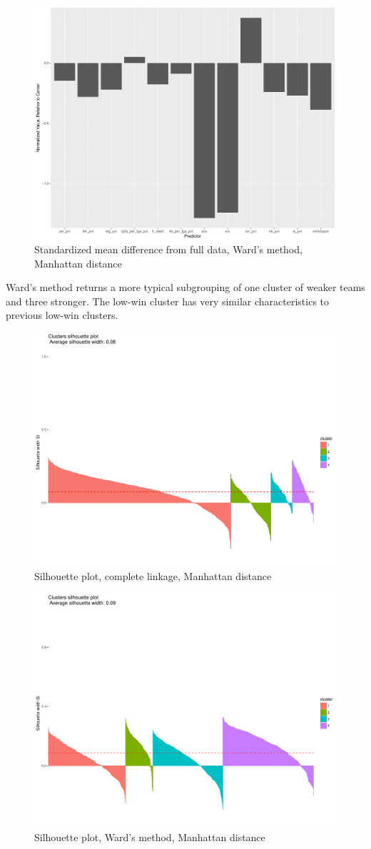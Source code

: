 \documentclass[10pt,a4paper, hidelinks]{article} %
\begin{document}
\begin{figure}[H]
	\centering
	\includegraphics[width=0.7\linewidth]{../fig/wardweak2}
	\caption{Standardized mean difference from full data, Ward's method, Manhattan distance}
\end{figure}

Ward's method returns a more typical subgrouping of one cluster of weaker teams and three stronger.  The low-win cluster has very similar characteristics to previous low-win clusters.

\begin{figure}[H]
	\centering
	\includegraphics[width=0.7\linewidth]{"../fig/compsil2"}
	\caption{Silhouette plot, complete linkage, Manhattan distance}
\end{figure}

\begin{figure}[H]
	\centering
	\includegraphics[width=0.7\linewidth]{"../fig/wardsil2"}
	\caption{Silhouette plot, Ward's method, Manhattan distance}
\end{figure}
\end{document}
